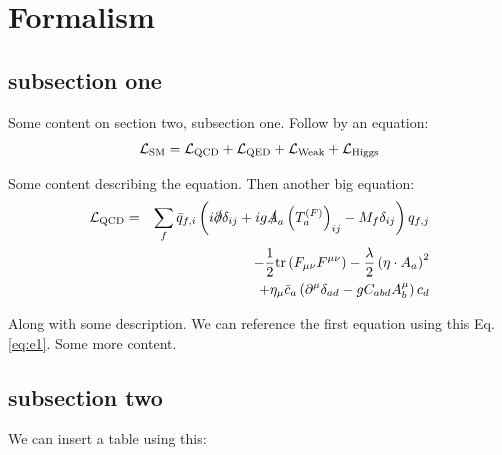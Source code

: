 \section{Formalism}

\subsection{subsection one}

Some content on section two, subsection one. Follow by an equation:
\begin{equation}\label{eq:e1}
\mathcal{L}_{\rm SM}=\mathcal{L}_{\rm QCD}+\mathcal{L}_{\rm QED}+\mathcal{L}_{\rm Weak}+\mathcal{L}_{\rm Higgs}
\end{equation}

Some content describing the equation. Then another big equation:
\begin{eqnarray}
\mathcal{L}_{\rm QCD}
&=&\sum_f \bar{q}_{f,i}\left(i\slashed{\partial}\delta_{ij}+ig\slashed{A}_a\left(T_a^{(F)}\right)_{ij}-M_f\delta_{ij}\right)q_{f,j}\nonumber\\
&&-\frac{1}{2}{\rm tr}\left(F_{\mu\nu}F^{\mu\nu}\right)-\frac{\lambda}{2}\left(\eta\cdot A_a\right)^2\nonumber\\
&&+\eta_\mu\bar{c}_a\left(\partial^\mu\delta_{ad}-gC_{abd}A_b^\mu\right)c_d
\end{eqnarray}

Along with some description.
We can reference the first equation using this Eq. \ref{eq:e1}.
Some more content.

\subsection{subsection two}

We can insert a table using this:

